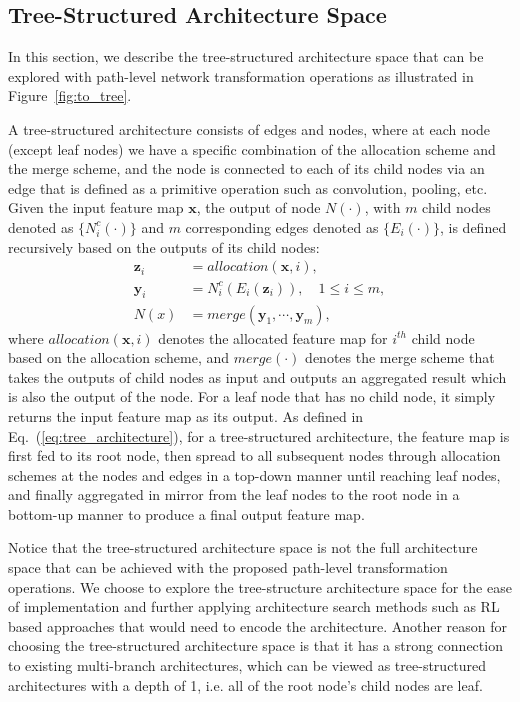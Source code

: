 \documentclass{article}
\newcommand{\bs}{\boldsymbol}
\newcommand{\bx}{\bs{x}}
\newcommand{\bz}{\bs{z}}
\newcommand{\by}{\bs{y}}
\begin{document}
\subsection{Tree-Structured Architecture Space}\label{sec:tree_arch_space}

In this section, we describe the tree-structured architecture space that can be explored with path-level network transformation operations as illustrated in Figure~\ref{fig:to_tree}. 

A tree-structured architecture consists of edges and nodes, where at each node (except leaf nodes) we have a specific combination of the allocation scheme and the merge scheme, and the node is connected to each of its child nodes via an edge that is defined as a primitive operation such as convolution, pooling, etc.
Given the input feature map $\bx$, the output of node $N(\cdot)$, with $m$ child nodes denoted as $\{N^c_i(\cdot)\}$ and $m$ corresponding edges denoted as $\{E_i(\cdot)\}$, is defined recursively based on the outputs of its child nodes:
{\small
\begin{align}\label{eq:tree_architecture}
	\bz_i &= allocation(\bx, i), \nonumber \\
	\by_i &= N^c_i(E_i(\bz_i)), \quad 1 \leq i \leq m, \\
	N(x) &= merge(\by_1, \cdots, \by_m), \nonumber
\end{align}
}where $allocation(\bx, i)$ denotes the allocated feature map for $i^{th}$ child node based on the allocation scheme, and $merge(\cdot)$ denotes the merge scheme that takes the outputs of child nodes as input and outputs an aggregated result which is also the output of the node. For a leaf node that has no child node, it simply returns the input feature map as its output. As defined in Eq.~(\ref{eq:tree_architecture}), for a tree-structured architecture, the feature map is first fed to its root node, then spread to all subsequent nodes through allocation schemes at the nodes and edges in a top-down manner until reaching leaf nodes, and finally aggregated in mirror from the leaf nodes to the root node in a bottom-up manner to produce a final output feature map.


Notice that the tree-structured architecture space is not the full architecture space that can be achieved with the proposed path-level transformation operations. We choose to explore the tree-structure architecture space for the ease of implementation and further applying architecture search methods such as RL based approaches \cite{cai2018efficient} that would need to encode the architecture. Another reason for choosing the tree-structured architecture space is that it has a strong connection to existing multi-branch architectures, which can be viewed as tree-structured architectures with a depth of 1, i.e. all of the root node's child nodes are leaf. 
\end{document}

